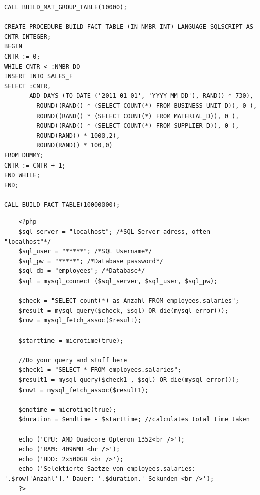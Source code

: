 \begin{lstlisting}
CALL BUILD_MAT_GROUP_TABLE(10000);
 
CREATE PROCEDURE BUILD_FACT_TABLE (IN NMBR INT) LANGUAGE SQLSCRIPT AS
CNTR INTEGER;
BEGIN
CNTR := 0;
WHILE CNTR < :NMBR DO
INSERT INTO SALES_F
SELECT :CNTR,
       ADD_DAYS (TO_DATE ('2011-01-01', 'YYYY-MM-DD'), RAND() * 730),
         ROUND((RAND() * (SELECT COUNT(*) FROM BUSINESS_UNIT_D)), 0 ),
         ROUND((RAND() * (SELECT COUNT(*) FROM MATERIAL_D)), 0 ),
         ROUND((RAND() * (SELECT COUNT(*) FROM SUPPLIER_D)), 0 ),
         ROUND(RAND() * 1000,2),
         ROUND(RAND() * 100,0)
FROM DUMMY;      
CNTR := CNTR + 1;
END WHILE;
END;
 
CALL BUILD_FACT_TABLE(10000000);
\end{lstlisting}

\begin{lstlisting}
	<?php
	$sql_server = "localhost"; /*SQL Server adress, often "localhost"*/
	$sql_user = "*****"; /*SQL Username*/
	$sql_pw = "*****"; /*Database password*/
	$sql_db = "employees"; /*Database*/
	$sql = mysql_connect ($sql_server, $sql_user, $sql_pw);

	$check = "SELECT count(*) as Anzahl FROM employees.salaries";
	$result = mysql_query($check, $sql) OR die(mysql_error());
	$row = mysql_fetch_assoc($result);

	$starttime = microtime(true);

	//Do your query and stuff here
	$check1 = "SELECT * FROM employees.salaries";
	$result1 = mysql_query($check1 , $sql) OR die(mysql_error());
	$row1 = mysql_fetch_assoc($result1);

	$endtime = microtime(true);
	$duration = $endtime - $starttime; //calculates total time taken

	echo ('CPU: AMD Quadcore Opteron 1352<br />');
	echo ('RAM: 4096MB <br />');
	echo ('HDD: 2x500GB <br />');
	echo ('Selektierte Saetze von employees.salaries: '.$row['Anzahl'].' Dauer: '.$duration.' Sekunden <br />');
	?>
\end{lstlisting}

